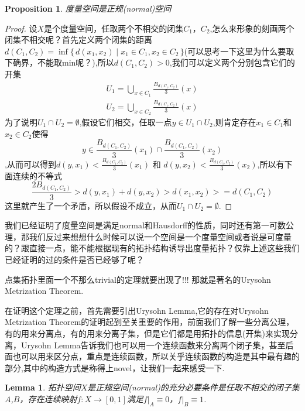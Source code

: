 \documentclass{article}
\newtheorem{lemma}[theorem]{Lemma}
\newtheorem{proposition}[theorem]{Proposition}
\newcommand*{\xfunc}[4]{{#2}\colon{#3}{#1}{#4}}
\newcommand*{\func}[3]{\xfunc{\to}{#1}{#2}{#3}}
\newcommand\Set[2]{\{\,#1\mid#2\,\}} %
\begin{document}
\begin{proposition}
度量空间是正规(normal)空间
\end{proposition}

\begin{proof}
设$X$是个度量空间，任取两个不相交的闭集$C_1$，$C_2$,怎么来形象的刻画两个闭集不相交呢？首先定义两个闭集的距离$d(C_1,C_2)=\inf\Set{d(x_1,x_2)}{x_1 \in C_1,x_2 \in C_2}$(可以思考一下这里为什么要取下确界，不能取min呢？),所以$d(C_1,C_2)>0$,我们可以定义两个分别包含它们的开集 
\begin{align} 
U_1 = \bigcup\limits_{x \in C_1}\frac{B_{d(C_1,C_2)}}{3}(x) \\ 
U_2 = \bigcup\limits_{x \in C_2}\frac{B_{d(C_1,C_2)}}{3}(x) 
\end{align}
为了说明$U_1 \cap U_2 = \emptyset$,假设它们相交，任取一点$y \in U_1 \cap U_2 $,则肯定存在$x_1 \in C_1$和$x_2 \in C_2$使得\[y \in \frac{B_{d(C_1,C_2)}}{3}(x_1) \cap \frac{B_{d(C_1,C_2)}}{3}(x_2) \],从而可以得到$d(y,x_1) < \frac{B_{d(C_1,C_2)}}{3}(x_1)$ 和 $d(y,x_2) < \frac{B_{d(C_1,C_2)}}{3}(x_2)$,所以有下面连续的不等式\[\frac{2B_{d(C_1,C_2)}}{3} > d(y,x_1) + d(y,x_2) > d(x_1,x_2) >= d(C_1,C_2)\]这里就产生了一个矛盾，所以假设不成立，从而$U_1 \cap U_2 = \emptyset$.
\end{proof}

我们已经证明了度量空间是满足\rm normal和\rm Hausdorff的性质，同时还有第一可数公理，那我们反过来想想什么时候可以说一个空间是一个度量空间或者说是可度量的？跟直接一点，能不能根据现有的拓扑结构诱导出度量拓扑？仅靠上述这些我们已经证明的过的条件是否已经够了呢？

点集拓扑里面一个不那么trivial的定理就要出现了!!! 那就是著名的Urysohn Metrization Theorem.

在证明这个定理之前，首先需要引出Urysohn Lemma,它的存在对Urysohn Metrization Theorem的证明起到至关重要的作用，前面我们了解一些分离公理，有的用来分离点，有的用来分离子集，但是它们都是用拓扑的信息(开集)来实现分离，Urysohn Lemma告诉我们也可以用一个连续函数来分离两个闭子集，甚至后面也可以用来区分点，重点是连续函数，所以关乎连续函数的构造是其中最有趣的部分,其中的构造方式是称得上novel，让我们一起来感受一下.



\begin{lemma}
拓扑空间$X$是正规空间(normal)的充分必要条件是任取不相交的闭子集$A$,$B$，存在连续映射$\func{f}{X}{[0,1]}$满足$f|_A \equiv 0$，$f|_B \equiv 1$.
\end{lemma}
\end{document}

